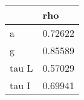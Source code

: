 \begin{tabular}{ll}
& rho \\ 
\hline 
a & 0.72622 \\ 
g & 0.85589 \\ 
tau L & 0.57029 \\ 
tau I & 0.69941 \\ 
\hline 
\end{tabular}
